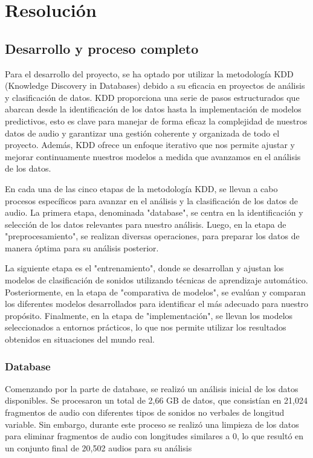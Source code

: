 
\section{Resolución}

\subsection{Desarrollo y proceso completo}

Para el desarrollo del proyecto, se ha optado por utilizar la metodología KDD (Knowledge Discovery in Databases) debido a su eficacia en proyectos de análisis y clasificación de datos. KDD proporciona una serie de pasos estructurados que abarcan desde la identificación de los datos hasta la implementación de modelos predictivos, esto es clave para manejar de forma eficaz la complejidad de nuestros datos de audio y garantizar una gestión coherente y organizada de todo el proyecto. Además, KDD ofrece un enfoque iterativo que nos permite ajustar y mejorar continuamente nuestros modelos a medida que avanzamos en el análisis de los datos.  

En cada una de las cinco etapas de la metodología KDD, se llevan a cabo procesos específicos para avanzar en el análisis y la clasificación de los datos de audio. La primera etapa, denominada "database", se centra en la identificación y selección de los datos relevantes para nuestro análisis. Luego, en la etapa de "preprocesamiento", se realizan diversas operaciones, para preparar los datos de manera óptima para su análisis posterior. 

La siguiente etapa es el "entrenamiento", donde se desarrollan y ajustan los modelos de clasificación de sonidos utilizando técnicas de aprendizaje automático. Posteriormente, en la etapa de "comparativa de modelos", se evalúan y comparan los diferentes modelos desarrollados para identificar el más adecuado para nuestro propósito. Finalmente, en la etapa de "implementación", se llevan los modelos seleccionados a entornos prácticos, lo que nos permite utilizar los resultados obtenidos en situaciones del mundo real.

\subsubsection{Database}

Comenzando por la parte de database, se realizó un análisis inicial de los datos disponibles. Se procesaron un total de 2,66 GB de datos, que consistían en 21,024 fragmentos de audio con diferentes tipos de sonidos no verbales de longitud variable. Sin embargo, durante este proceso se realizó una limpieza de los datos para eliminar fragmentos de audio con longitudes similares a 0, lo que resultó en un conjunto final de 20,502 audios para su análisis 

